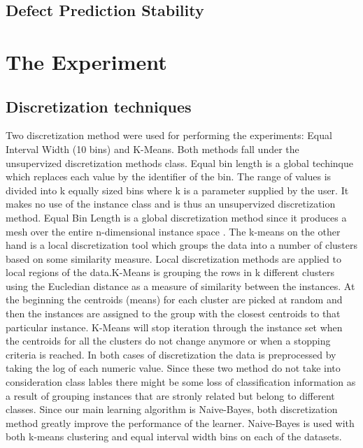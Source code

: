 \documentclass{sig-alternate}
\begin{document}
\subsection{Defect Prediction Stability}



\section{The Experiment}

\subsection{Discretization techniques}
Two discretization method were used for performing the experiments: Equal Interval Width (10 bins) and K-Means. Both methods fall under the unsupervized discretization methods class. Equal bin length is a global techinque which replaces each value by the identifier of the bin. The range of values is divided into k equally sized bins where k is a parameter supplied by the user. It makes no use of the instance class and is thus an unsupervized discretization method. Equal Bin Length is a global discretization  method since it produces a mesh over the entire n-dimensional instance space \cite {dough95}. The k-means on the other hand is a local discretization tool which groups the data into a number of clusters based on some similarity measure. Local discretization methods are applied to local regions of the data.K-Means is grouping the rows in k different clusters using the Eucledian distance as a measure of similarity between the instances. At the beginning the centroids (means) for each cluster are picked at random and then the instances are assigned to the group with the closest centroids to that particular instance. K-Means will stop iteration through the instance set when the centroids for all the clusters do not change anymore or when a stopping criteria is reached. In both cases of discretization the data is preprocessed by taking the log of each numeric value. Since these two method do not take into consideration class lables there might be some loss of classification information as a result of grouping instances that are stronly related but belong to different classes. 
Since our main learning algorithm is Naive-Bayes, both discretization method greatly improve the performance of the learner. Naive-Bayes is used with both k-means clustering and equal interval width bins on each of the datasets.
\end{document}
